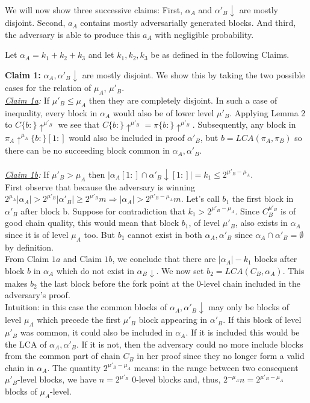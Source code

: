 \documentclass[9pt,a4paper]{article}
\begin{document}
We will now show three successive claims: First, $\alpha_A$ and $\alpha'_B \downarrow$ are mostly disjoint. Second, $a_A$ contains mostly adversarially generated blocks. And third, the adversary is able to produce this $a_A$ with negligible probability.

Let $\alpha_A = k_1 + k_2 + k_3$ and let $k_1, k_2, k_3$ be as defined in the following Claims.

\textbf{Claim 1:} $\alpha_A, \alpha'_B\downarrow$ are mostly disjoint. We show this by taking the two possible cases for the relation of $\mu_A$, $\mu'_B$.\\
\textit{\underline{Claim 1a}:} If $\mu'_B \leq \mu_A$ then they are completely disjoint. In such a case of inequality, every block in $\alpha_A$ would also be of lower level $\mu'_B$. Applying Lemma 2 to $C\{b:\}\uparrow^{\mu'_B}$  we see that $C\{b:\}\uparrow^{\mu'_B} = \pi\{b:\}\uparrow^{\mu'_B}$. Subsequently, any block in $\pi_A\uparrow^{\mu_A}\{b:\}[1:]$ would also be included in proof $\alpha'_B$, but $b=LCA(\pi_A, \pi_B)$ so there can be no succeeding block common in $\alpha_A, \alpha'_B$. \\
\\
\textit{\underline{Claim 1b}:} If  $\mu'_B > \mu_A$ then $\vert \alpha_A[1:] \cap \alpha'_B\downarrow[1:] \vert = k_1 \leq 2^{\mu'_B - \mu_A}$.\\
First observe that because the adversary is winning $2^{\mu_A} \vert \alpha_A \vert > 2^{\mu'_B} \vert \alpha'_B \vert \geq 2^{\mu'_B} m \Rightarrow \vert \alpha_A \vert > 2^{\mu'_B - \mu_A}m$.
Let's call $b_1$ the first block in $\alpha'_B$ after block b.
Suppose for contradiction that $k_1 > 2^{\mu'_B - \mu_A}$.  Since $C_B^{\mu'_B}$ is of good chain quality, this would mean that block $b_1$, of level $\mu'_B$, also exists in $\alpha_A$ since it is of level $\mu_A$ too. But $b_1$ cannot exist in both $\alpha_A, \alpha'_B$ since $\alpha_A \cap \alpha'_B = \emptyset$ by definition.  \\


From Claim $1a$ and Claim $1b$, we conclude that there are $\vert \alpha_A \vert - k_1$ blocks after block $b$ in $\alpha_A$ which do not exist in $\alpha_B\downarrow$. We now set $b_2 = LCA(C_B, \alpha_A)$. This makes $b_2$ the last block before the fork point at the 0-level chain included in the adversary's proof.\\

Intuition: in this case the common blocks of $\alpha_A, \alpha'_B\downarrow$ may only be blocks of level $\mu_A$ which precede the first $\mu'_B$ block appearing in $\alpha'_B$. If this block of level $\mu'_B$ was common, it could also be included in $\alpha_A$. If it is included this would be the LCA of $\alpha_A, \alpha'_B$. If it is not, then the adversary could no more include blocks from the common part of chain $C_B$ in her proof since they no longer form a valid chain in $\alpha_A$. The quantity $2^{\mu'_B - \mu_A}$ means: in the range between two consequent $\mu'_B$-level blocks, we have $n = 2^{\mu'_B}$ 0-level blocks and, thus, $2^{-\mu_A}n = 2^{\mu'_B - \mu_A}$ blocks of $\mu_A$-level. \\
\end{document}
